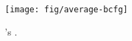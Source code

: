 \begin{figure}[!ht]
\begin{center}
\texttt{[image: fig/average-bcfg]}
\caption{'s \BG.}\label{fig-average-bcfg}
\end{center}
\end{figure}
